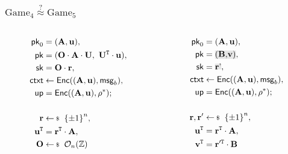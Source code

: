 \documentclass[xcolor=table,10pt,aspectratio=169]{beamer}
\begin{document}
\begin{frame}
  \frametitle{\(\text{Game}_4 \overset{?}{\approx} \text{Game}_5\)}

  \begin{columns}

    \begin{column}{0.5\linewidth}
      \begin{align*}
        \pk_0 &= (\mat{A},\vec{u}),\\
        \pk &= (\mat{O}\cdot\mat{A}\cdot\mat{U},\ \mat{U}^\transpose\cdot\vec{u}),\\
        \sk &= \mat{O}\cdot\vec{r},\\
        \ctxt &\from \enc((\mat{A},\vec{u}), \msg_b),\\
        \up &= \enc((\mat{A},\vec{u}),\rnd^*); \\
        \\
        \vec{r} &\sample \set{\pm 1}^n,\\
        \vec{u}^\transpose &= \vec{r}^\transpose \cdot \mat{A},\\
        \mat{O} & \sample \Ort_n(\ZZ)
      \end{align*}
    \end{column}
    \begin{column}{0.5\linewidth}
      \begin{align*}
        \pk_0 &= (\mat{A},\vec{u}),\\
        \pk &= \gamechange{(\mat{B},\vec{v})},\\
        \sk &= \gamechange{\vec{r}'},\\
        \ctxt &\from \enc((\mat{A},\vec{u}), \msg_b),\\
        \up &= \enc((\mat{A},\vec{u}),\rnd^*); \\
        \\
        \vec{r},\vec{r}' &\sample \set{\pm 1}^n,\\
        \vec{u}^\transpose &= \vec{r}^\transpose \cdot \mat{A},\\
        \vec{v}^\transpose &= \vec{r}'^\transpose\cdot\mat{B}
      \end{align*}
    \end{column}
  \end{columns}
\end{frame}
\end{document}
